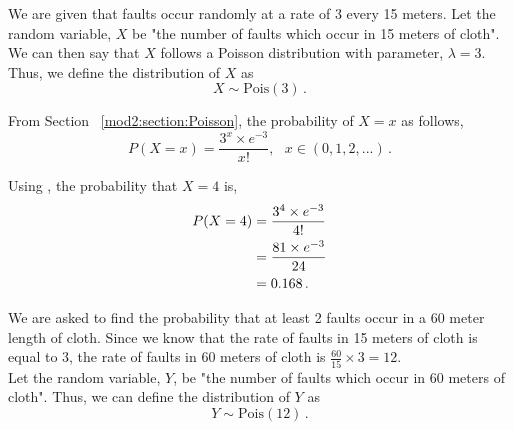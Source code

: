 %
%

\begin{subquestions}
\subquestion

\begin{subsubquestions}
	
\subsubquestion

We are given that faults occur randomly at a rate of 3 every 15 meters. Let the random variable, $X$ be "the number of faults which occur in 15 meters of cloth". We can then say that $X$ follows a Poisson distribution with parameter, $\lambda = 3$. \\
Thus, we define the distribution of $X$ as
\begin{equation}
	X \sim \text{Pois}(3) \,.
\end{equation}
	
From Section ~\ref{mod2:section:Poisson}, the probability of $X=x$ as follows,
\begin{equation}
	P(X=x) = \frac{3^{x} \times e^{-3}}{x!}, ~~~ x \in (0, 1, 2, ...)\,. \label{2014:q4:PoisEqn}
\end{equation}
	
Using , the probability that $X=4$ is,
\begin{align}
	P(X=4) & = \frac{3^{4} \times e^{-3}}{4!} \nonumber \\
	       & = \frac{81 \times e^{-3}}{24} \nonumber \\
	       & = 0.168 \,.
\end{align} 


\subsubquestion

We are asked to find the probability that at least 2 faults occur in a 60 meter length of cloth. Since we know that  the rate of faults in 15 meters of cloth is equal to 3, the rate of faults in 60 meters of cloth is $\frac{60}{15} \times 3 = 12$. \\
Let the random variable, $Y$, be "the number of faults which occur in 60 meters of cloth". Thus, we can define the distribution of $Y$ as
\begin{equation}
	Y \sim \text{Pois}(12) \,.
\end{equation}


\end{subsubquestions}
\end{subquestions}
